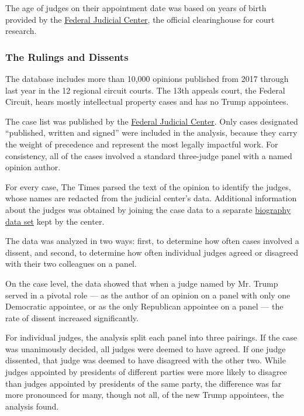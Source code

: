 The age of judges on their appointment date was based on years of birth
provided by the \href{https://www.fjc.gov/history/judges}{Federal
Judicial Center}, the official clearinghouse for court research.

\hypertarget{the-rulings-and-dissents}{%
\subsubsection{The Rulings and
Dissents}\label{the-rulings-and-dissents}}

The database includes more than 10,000 opinions published from 2017
through last year in the 12 regional circuit courts. The 13th appeals
court, the Federal Circuit, hears mostly intellectual property cases and
has no Trump appointees.

The case list was published by the
\href{https://www.fjc.gov/research/idb/appellate-cases-filed-terminated-and-pending-fy-2008-present}{Federal
Judicial Center}. Only cases designated ``published, written and
signed'' were included in the analysis, because they carry the weight of
precedence and represent the most legally impactful work. For
consistency, all of the cases involved a standard three-judge panel with
a named opinion author.

For every case, The Times parsed the text of the opinion to identify the
judges, whose names are redacted from the judicial center's data.
Additional information about the judges was obtained by joining the case
data to a separate \href{https://www.fjc.gov/history/judges}{biography
data set} kept by the center.

The data was analyzed in two ways: first, to determine how often cases
involved a dissent, and second, to determine how often individual judges
agreed or disagreed with their two colleagues on a panel.

On the case level, the data showed that when a judge named by Mr. Trump
served in a pivotal role --- as the author of an opinion on a panel with
only one Democratic appointee, or as the only Republican appointee on a
panel --- the rate of dissent increased significantly.

For individual judges, the analysis split each panel into three
pairings. If the case was unanimously decided, all judges were deemed to
have agreed. If one judge dissented, that judge was deemed to have
disagreed with the other two. While judges appointed by presidents of
different parties were more likely to disagree than judges appointed by
presidents of the same party, the difference was far more pronounced for
many, though not all, of the new Trump appointees, the analysis found.

